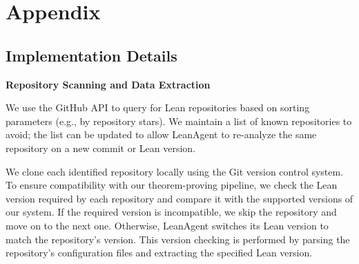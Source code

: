 \documentclass{article} %
\begin{document}




\appendix
\section{Appendix}

\subsection{Implementation Details}
\label{sec:implementation_details}





\textbf{Repository Scanning and Data Extraction}

We use the GitHub API to query for Lean repositories based on sorting parameters (e.g., by repository stars). We maintain a list of known repositories to avoid; the list can be updated to allow LeanAgent to re-analyze the same repository on a new commit or Lean version.

We clone each identified repository locally using the Git version control system. To ensure compatibility with our theorem-proving pipeline, we check the Lean version required by each repository and compare it with the supported versions of our system. If the required version is incompatible, we skip the repository and move on to the next one. Otherwise, LeanAgent switches its Lean version to match the repository's version. This version checking is performed by parsing the repository's configuration files and extracting the specified Lean version.
\end{document}
